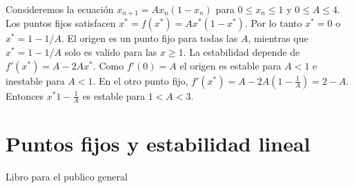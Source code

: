         Consideremos la ecuación $x_{n+1} = A x_{n} (1 - x_{n})$ para $0 \leq x_{n} \leq 1$ y $0 \leq A \leq 4$. Los puntos fijos satisfacen $x^{*} = f(x^{*}) = A x^{*}(1 - x^{*})$. Por lo tanto $x^{*} = 0$  o $x^{*} = 1 - 1/A$. El origen es un punto fijo para todas las $A$, mientras que $x^{*} = 1 - 1/A$ solo es valido para las $x \geq 1$. La estabilidad depende de $f'(x^{*}) = A - 2Ax^{*}$. Como $f'(0) = A $ el origen es estable para $A < 1$ e inestable para $A < 1$. En el otro punto fijo, $f'(x^{*}) = A - 2 A \left( 1 - \frac{1}{A} \right) = 2 - A$. Entonces $x^{*} 1 - \frac{1}{A} $ es estable para $1 < A < 3$.

    \section{Puntos fijos y estabilidad lineal}
        

            

Libro para el publico general \cite{Gleick1987}
 
